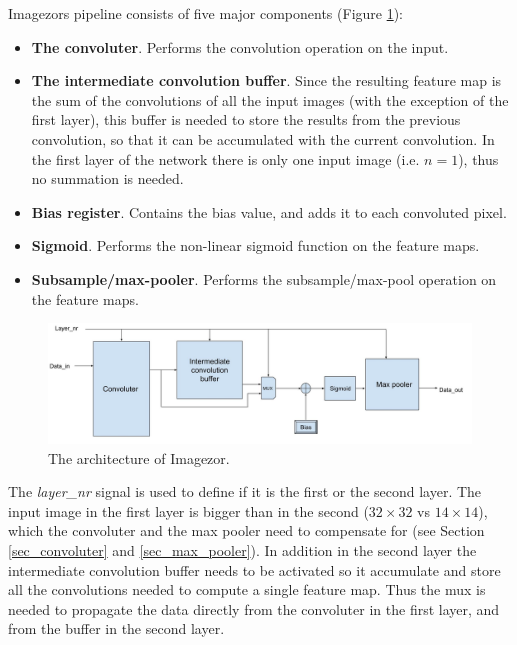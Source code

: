 Imagezors pipeline consists of five major components (Figure \ref{fig_imagezor_architecture}):

\begin{itemize}
	\item \textbf{The convoluter}. Performs the convolution operation on the input.
	\item \textbf{The intermediate convolution buffer}. Since the resulting feature map is the sum of the convolutions of all the input images (with the exception of the first layer), this buffer is needed to store the results from the previous convolution, so that it can be accumulated with the current convolution. In the first layer of the network there is only one input image (i.e. $ n = 1 $), thus no summation is needed.
	\item \textbf{Bias register}. Contains the bias value, and adds it to each convoluted pixel. 
	\item \textbf{Sigmoid}. Performs the non-linear sigmoid function  on the feature maps.
	\item \textbf{Subsample/max-pooler}. Performs the subsample/max-pool operation on the feature maps. 
\end{itemize}

\begin{figure}[h!]
	\centering
    	\includegraphics[width=1.0\textwidth]{Figures/Method/conv_layer_arch}
  	\caption{The architecture of Imagezor.}
  	\label{fig_imagezor_architecture}
\end{figure}

The \textit{layer\_nr} signal is used to define if it is the first or the second layer. The input image in the first layer is bigger than in the second ($ 32 \times 32 $ vs $ 14 \times 14 $), which the convoluter and the max pooler need to compensate for (see Section \ref{sec_convoluter} and \ref{sec_max_pooler}). In addition in the second layer the intermediate convolution buffer needs to be activated so it accumulate and store all the convolutions needed to compute a single feature map. Thus the mux is needed to propagate the data directly from the convoluter in the first layer, and from the buffer in the second layer. 

